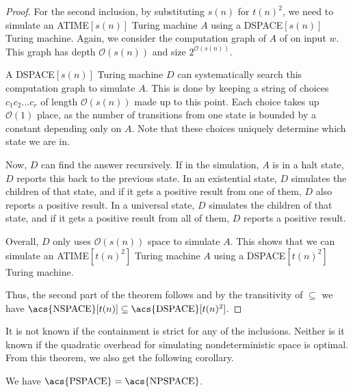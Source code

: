 \begin{proof}
    \vspace{5mm}

    \sloppy For the second inclusion, by substituting $s(n)$ for $t(n)^2$, we need to simulate an \acs{ATIME}$[s(n)]$ Turing machine $A$ using a \acs{DSPACE}$[s(n)]$ Turing machine.
    Again, we consider the computation graph of $A$ of on input $w$.
    This graph has depth $\mathcal{O}(s(n))$ and size $2^{\mathcal{O}(s(n))}$.

    A \acs{DSPACE}$[s(n)]$ Turing machine $D$ can systematically search this computation graph to simulate $A$.
    This is done by keeping a string of choices $c_{1}c_{2}\dots c_r$ of length $\mathcal{O}(s(n))$ made up to this point.
    Each choice takes up $\mathcal{O}(1)$ place, as the number of transitions from one state is bounded by a constant depending only on $A$.
    Note that these choices uniquely determine which state we are in.

    Now, $D$ can find the answer recursively.
    If in the simulation, $A$ is in a halt state, $D$ reports this back to the previous state.
    In an existential state, $D$ simulates the children of that state, and if it gets a positive result from one of them, $D$ also reports a positive result.
    In a universal state, $D$ simulates the children of that state, and if it gets a positive result from all of them, $D$ reports a positive result.

    Overall, $D$ only uses $\mathcal{O}(s(n))$ space to simulate $A$.
    This shows that we can simulate an \acs{ATIME}$[t(n)^2]$ Turing machine $A$ using a \acs{DSPACE}$[t(n)^2]$ Turing machine.

    Thus, the second part of the theorem follows and by the transitivity of $\subseteq$ we have $\text{\acs{NSPACE}}[t(n)] \subseteq \text{\acs{DSPACE}}[t(n)^2]$.
\end{proof}

It is not known if the containment is strict for any of the inclusions.
Neither is it known if the quadratic overhead for simulating nondeterministic space is optimal.
From this theorem, we also get the following corollary.

\begin{corollary}
    We have $\text{\upshape \acs{PSPACE}} = \text{\upshape \acs{NPSPACE}}$.
\end{corollary}

